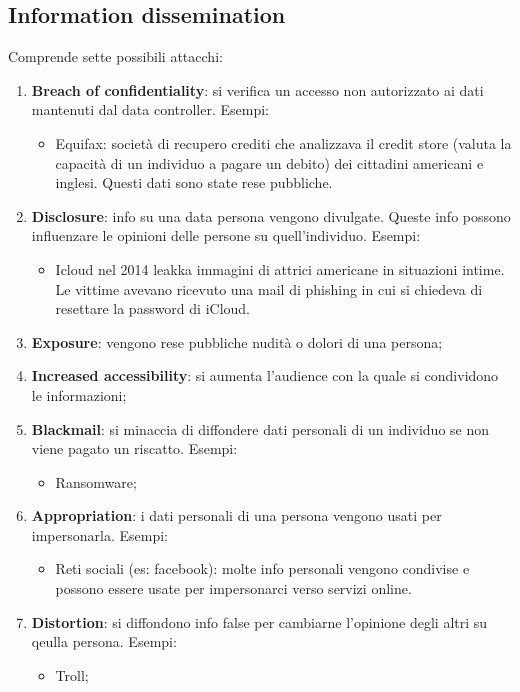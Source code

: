 \subsection{Information dissemination}
Comprende sette possibili attacchi:
\begin{enumerate}
    \item \textbf{Breach of confidentiality}: si verifica un accesso non autorizzato ai dati mantenuti dal data controller. Esempi:
    \begin{itemize}
        \item Equifax: società di recupero crediti che analizzava il credit store (valuta la capacità di un individuo a pagare un debito) dei cittadini americani e inglesi. Questi dati sono state rese pubbliche.
    \end{itemize}
    \item \textbf{Disclosure}: info su una data persona vengono divulgate. Queste info possono influenzare le opinioni delle persone su quell'individuo. Esempi:
    \begin{itemize}
        \item  Icloud nel 2014 leakka immagini di attrici americane in situazioni intime. Le vittime avevano ricevuto una mail di phishing in cui si chiedeva di resettare la password di iCloud.
    \end{itemize}
    \item \textbf{Exposure}: vengono rese pubbliche nudità o dolori di una persona;
    \item \textbf{Increased accessibility}: si aumenta l'audience con la quale si condividono le informazioni;
    \item \textbf{Blackmail}: si minaccia di diffondere dati personali di un individuo se non viene pagato un riscatto. Esempi:
    \begin{itemize}
        \item Ransomware;
    \end{itemize}
    \item \textbf{Appropriation}: i dati personali di una persona vengono usati per impersonarla. Esempi:
    \begin{itemize}
        \item Reti sociali (es: facebook): molte info personali vengono condivise e possono essere usate per impersonarci verso servizi online.
    \end{itemize}
    \item \textbf{Distortion}: si diffondono info false per cambiarne l'opinione degli altri su qeulla persona. Esempi:
    \begin{itemize}
        \item Troll;
    \end{itemize}
\end{enumerate}

